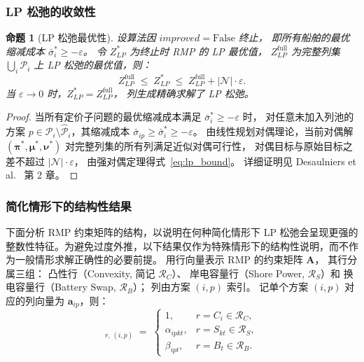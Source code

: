 \documentclass[UTF8, a4paper, 12pt]{ctexart}
\theoremstyle{plain}
\newtheorem{proposition}{命题}
\theoremstyle{definition}
\theoremstyle{remark}
\begin{document}
\subsubsection{LP 松弛的收敛性}

\begin{proposition}[LP 松弛最优性]
\label{prop:lp}
设算法因 $\textit{improved} = \mathrm{False}$ 终止，
即所有船舶的最优缩减成本 $\bar{\sigma}_i^* \ge -\varepsilon$。
令 $Z_{LP}^*$ 为终止时 RMP 的 LP 最优值，
$Z_{LP}^{\text{full}}$ 为完整列集 $\bigcup_i \mathcal{P}_i$ 上 LP 松弛的最优值，则：
\begin{equation}
  Z_{LP}^{\text{full}} \;\le\; Z_{LP}^* \;\le\; Z_{LP}^{\text{full}} + |\mathcal{N}|\cdot\varepsilon.
  \label{eq:lp_bound}
\end{equation}
当 $\varepsilon\to 0$ 时，$Z_{LP}^* = Z_{LP}^{\text{full}}$，
列生成精确求解了 LP 松弛。
\end{proposition}

\begin{proof}
当所有定价子问题的最优缩减成本满足 $\bar{\sigma}_i^*\ge -\varepsilon$ 时，
对任意未加入列池的方案 $p\in\mathcal{P}_i\setminus\hat{\mathcal{P}}_i$，其缩减成本
$\bar{\sigma}_{ip}\ge\bar{\sigma}_i^*\ge -\varepsilon$。
由线性规划对偶理论，当前对偶解
$(\boldsymbol{\pi}^*,\boldsymbol{\mu}^*,\boldsymbol{\nu}^*)$
对完整列集的所有列满足近似对偶可行性，
对偶目标与原始目标之差不超过 $|\mathcal{N}|\cdot\varepsilon$，
由强对偶定理得式~\eqref{eq:lp_bound}。
详细证明见 Desaulniers et al.~\cite{Desaulniers2005} 第 2 章。
\end{proof}

\subsubsection{简化情形下的结构性结果}

下面分析 RMP 约束矩阵的结构，以说明在何种简化情形下 LP 松弛会呈现更强的整数性特征。为避免过度外推，以下结果仅作为特殊情形下的结构性说明，而不作为一般情形求解正确性的必要前提。
用行向量表示 RMP 的约束矩阵 $\mathbf{A}$，
其行分属三组：
凸性行（Convexity, 简记 $\mathcal{R}_C$）、
岸电容量行（Shore Power, $\mathcal{R}_S$）和
换电容量行（Battery Swap, $\mathcal{R}_B$）；
列由方案 $(i,p)$ 索引。
记单个方案 $(i,p)$ 对应的列向量为 $\mathbf{a}_{ip}$，则：
\begin{equation}
  [\mathbf{A}]_{r,\,(i,p)}
  \;=\;
  \begin{cases}
    1, & r = C_i\in\mathcal{R}_C, \\
    \alpha_{ipkt}, & r = S_{kt}\in\mathcal{R}_S, \\
    \beta_{ipt},   & r = B_{t}\in\mathcal{R}_B.
  \end{cases}
\end{equation}
\end{document}
